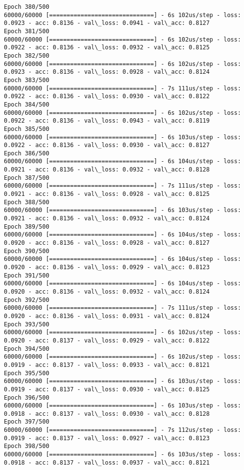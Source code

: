 \documentclass[11pt]{article}
\begin{document}
\begin{Verbatim}[commandchars=\\\{\}]
Epoch 380/500
60000/60000 [==============================] - 6s 102us/step - loss: 0.0923 - acc: 0.8136 - val\_loss: 0.0941 - val\_acc: 0.8127
Epoch 381/500
60000/60000 [==============================] - 6s 102us/step - loss: 0.0922 - acc: 0.8136 - val\_loss: 0.0932 - val\_acc: 0.8125
Epoch 382/500
60000/60000 [==============================] - 6s 102us/step - loss: 0.0923 - acc: 0.8136 - val\_loss: 0.0928 - val\_acc: 0.8124
Epoch 383/500
60000/60000 [==============================] - 7s 111us/step - loss: 0.0922 - acc: 0.8136 - val\_loss: 0.0930 - val\_acc: 0.8122
Epoch 384/500
60000/60000 [==============================] - 6s 102us/step - loss: 0.0922 - acc: 0.8136 - val\_loss: 0.0943 - val\_acc: 0.8119
Epoch 385/500
60000/60000 [==============================] - 6s 103us/step - loss: 0.0922 - acc: 0.8136 - val\_loss: 0.0930 - val\_acc: 0.8127
Epoch 386/500
60000/60000 [==============================] - 6s 104us/step - loss: 0.0921 - acc: 0.8136 - val\_loss: 0.0932 - val\_acc: 0.8128
Epoch 387/500
60000/60000 [==============================] - 7s 111us/step - loss: 0.0921 - acc: 0.8136 - val\_loss: 0.0928 - val\_acc: 0.8125
Epoch 388/500
60000/60000 [==============================] - 6s 103us/step - loss: 0.0921 - acc: 0.8136 - val\_loss: 0.0932 - val\_acc: 0.8124
Epoch 389/500
60000/60000 [==============================] - 6s 104us/step - loss: 0.0920 - acc: 0.8136 - val\_loss: 0.0928 - val\_acc: 0.8127
Epoch 390/500
60000/60000 [==============================] - 6s 104us/step - loss: 0.0920 - acc: 0.8136 - val\_loss: 0.0929 - val\_acc: 0.8123
Epoch 391/500
60000/60000 [==============================] - 6s 104us/step - loss: 0.0920 - acc: 0.8136 - val\_loss: 0.0932 - val\_acc: 0.8124
Epoch 392/500
60000/60000 [==============================] - 7s 111us/step - loss: 0.0920 - acc: 0.8136 - val\_loss: 0.0931 - val\_acc: 0.8124
Epoch 393/500
60000/60000 [==============================] - 6s 102us/step - loss: 0.0920 - acc: 0.8137 - val\_loss: 0.0929 - val\_acc: 0.8122
Epoch 394/500
60000/60000 [==============================] - 6s 102us/step - loss: 0.0919 - acc: 0.8137 - val\_loss: 0.0933 - val\_acc: 0.8121
Epoch 395/500
60000/60000 [==============================] - 6s 103us/step - loss: 0.0919 - acc: 0.8137 - val\_loss: 0.0930 - val\_acc: 0.8125
Epoch 396/500
60000/60000 [==============================] - 6s 103us/step - loss: 0.0918 - acc: 0.8137 - val\_loss: 0.0930 - val\_acc: 0.8128
Epoch 397/500
60000/60000 [==============================] - 7s 112us/step - loss: 0.0919 - acc: 0.8137 - val\_loss: 0.0927 - val\_acc: 0.8123
Epoch 398/500
60000/60000 [==============================] - 6s 103us/step - loss: 0.0918 - acc: 0.8137 - val\_loss: 0.0937 - val\_acc: 0.8121

\end{Verbatim}
\end{document}
